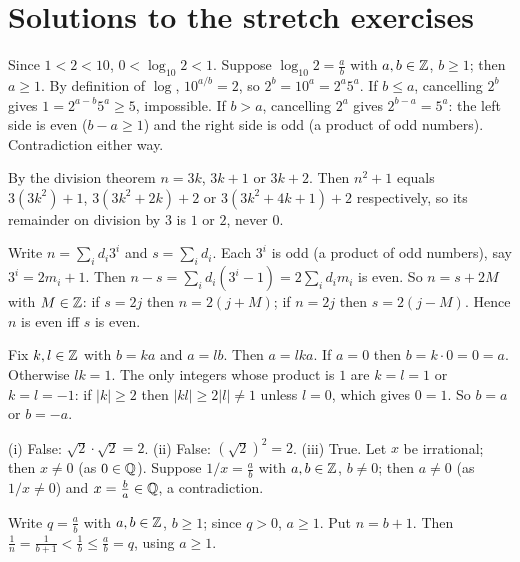 \renewcommand{\chapterprefix}{Appendix}\renewcommand{\thechapter}{S}
\chapter{Solutions to the stretch exercises}

 Since $1<2<10$, $0<\log_{10}2<1$. Suppose $\log_{10}2=\frac ab$ with $a,b\in\mathbb{Z}$, $b\ge1$; then $a\ge1$. By definition of $\log$, $10^{a/b}=2$, so $2^b=10^a=2^a5^a$. If $b\le a$, cancelling $2^b$ gives $1=2^{a-b}5^a\ge5$, impossible. If $b>a$, cancelling $2^a$ gives $2^{b-a}=5^a$: the left side is even ($b-a\ge1$) and the right side is odd (a product of odd numbers). Contradiction either way.

 By the division theorem $n=3k$, $3k+1$ or $3k+2$. Then $n^2+1$ equals $3(3k^2)+1$, $3(3k^2+2k)+2$ or $3(3k^2+4k+1)+2$ respectively, so its remainder on division by $3$ is $1$ or $2$, never $0$.

 Write $n=\sum_id_i3^i$ and $s=\sum_id_i$. Each $3^i$ is odd (a product of odd numbers), say $3^i=2m_i+1$. Then $n-s=\sum_id_i(3^i-1)=2\sum_id_im_i$ is even. So $n=s+2M$ with $M\in\mathbb{Z}$: if $s=2j$ then $n=2(j+M)$; if $n=2j$ then $s=2(j-M)$. Hence $n$ is even iff $s$ is even.

 Fix $k,l\in\mathbb{Z}$ with $b=ka$ and $a=lb$. Then $a=lka$. If $a=0$ then $b=k\cdot0=0=a$. Otherwise $lk=1$. The only integers whose product is $1$ are $k=l=1$ or $k=l=-1$: if $|k|\ge2$ then $|kl|\ge2|l|\ne1$ unless $l=0$, which gives $0=1$. So $b=a$ or $b=-a$.

 (i) False: $\sqrt2\cdot\sqrt2=2$. (ii) False: $(\sqrt2)^2=2$. (iii) True. Let $x$ be irrational; then $x\ne0$ (as $0\in\mathbb{Q}$). Suppose $1/x=\frac ab$ with $a,b\in\mathbb{Z}$, $b\ne0$; then $a\ne0$ (as $1/x\ne0$) and $x=\frac ba\in\mathbb{Q}$, a contradiction.

 Write $q=\frac ab$ with $a,b\in\mathbb{Z}$, $b\ge1$; since $q>0$, $a\ge1$. Put $n=b+1$. Then $\frac1n=\frac1{b+1}<\frac1b\le\frac ab=q$, using $a\ge1$.

